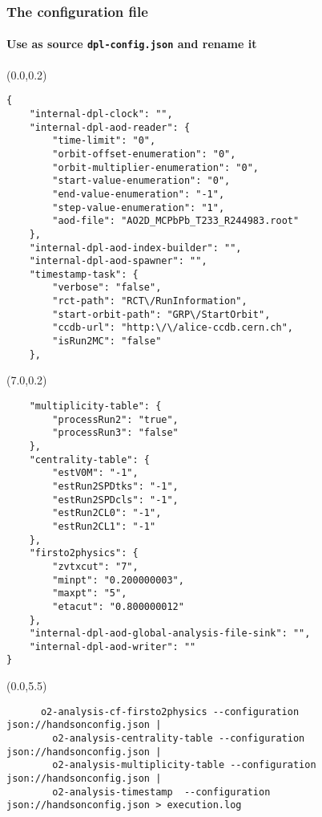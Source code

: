 \documentclass[14pt,aspectratio=169,t]{beamer}
\begin{document}
\begin{frame}[fragile]
  \frametitle{The configuration file}
  \framesubtitle{Use as source \texttt{dpl-config.json} and rename it}
  \begin{textblock}{6}(0.0,0.2)
    {\tiny\color{blue}
    \vspace{-0.0in}
    \begin{verbatim}
{
    "internal-dpl-clock": "",
    "internal-dpl-aod-reader": {
        "time-limit": "0",
        "orbit-offset-enumeration": "0",
        "orbit-multiplier-enumeration": "0",
        "start-value-enumeration": "0",
        "end-value-enumeration": "-1",
        "step-value-enumeration": "1",
        "aod-file": "AO2D_MCPbPb_T233_R244983.root"
    },
    "internal-dpl-aod-index-builder": "",
    "internal-dpl-aod-spawner": "",
    "timestamp-task": {
        "verbose": "false",
        "rct-path": "RCT\/RunInformation",
        "start-orbit-path": "GRP\/StartOrbit",
        "ccdb-url": "http:\/\/alice-ccdb.cern.ch",
        "isRun2MC": "false"
    },
    \end{verbatim}}
  \end{textblock}
  \begin{textblock}{6}(7.0,0.2)
    {\tiny\color{blue}
    \vspace{-0.0in}
    \begin{verbatim}
    "multiplicity-table": {
        "processRun2": "true",
        "processRun3": "false"
    },
    "centrality-table": {
        "estV0M": "-1",
        "estRun2SPDtks": "-1",
        "estRun2SPDcls": "-1",
        "estRun2CL0": "-1",
        "estRun2CL1": "-1"
    },
    "firsto2physics": {
        "zvtxcut": "7",
        "minpt": "0.200000003",
        "maxpt": "5",
        "etacut": "0.800000012"
    },
    "internal-dpl-aod-global-analysis-file-sink": "",
    "internal-dpl-aod-writer": ""
}
    \end{verbatim}}
  \end{textblock}
  \begin{textblock}{6}(0.0,5.5)
    {\tiny\color{black}
    \vspace{-0.0in}
    \begin{verbatim}
      o2-analysis-cf-firsto2physics --configuration json://handsonconfig.json |  
        o2-analysis-centrality-table --configuration json://handsonconfig.json | 
        o2-analysis-multiplicity-table --configuration json://handsonconfig.json | 
        o2-analysis-timestamp  --configuration json://handsonconfig.json > execution.log
    \end{verbatim}}
  \end{textblock}
\end{frame}
\end{document}
